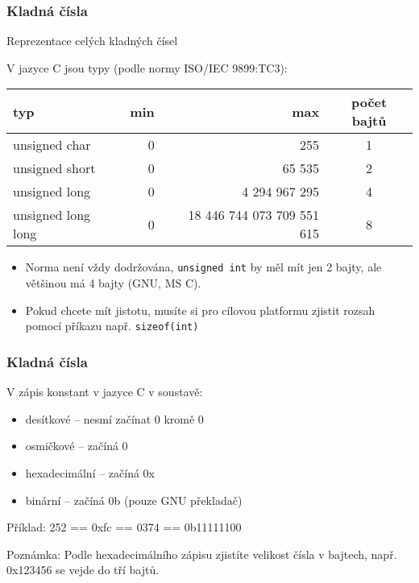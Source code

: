 \documentclass{beamer}
\begin{document}
\begin{frame}
\frametitle{Kladná čísla}
Reprezentace celých kladných čísel

V jazyce C jsou typy (podle normy ISO/IEC 9899:TC3):
\begin{tabular}{|l|r|r|c|}\hline
typ & min & max & počet bajtů\\ \hline
unsigned char & 0 & 255 & 1 \\ \hline
unsigned short & 0 & 65 535 & 2 \\ \hline 
unsigned long & 0 & 4 294 967 295 & 4 \\ \hline
unsigned long long & 0 & 18 446 744 073 709 551 615 & 8 \\ \hline
\end{tabular}

\begin{itemize}
\item Norma není vždy dodržována, \texttt{unsigned int} by měl mít jen 2 bajty, ale většinou má 4 bajty (GNU, MS C).
\item Pokud chcete mít jistotu, musíte si pro cílovou platformu zjistit rozsah pomocí příkazu např. \texttt{sizeof(int)}
\end{itemize}

\end{frame}


\begin{frame}
\frametitle{Kladná čísla}
V zápis konstant v jazyce C v soustavě:
\begin{itemize}
\item desítkové -- nesmí začínat 0 kromě 0
\item osmičkové -- začíná 0
\item hexadecimální -- začíná 0x
\item binární -- začíná 0b (pouze GNU překladač)
\end{itemize}
\bigskip
Příklad: 252 == 0xfc == 0374 == 0b11111100
\bigskip

Poznámka: Podle hexadecimálního zápisu zjistíte velikost čísla v bajtech, např. 0x123456 se vejde do tří bajtů.
\end{frame}
\end{document}
